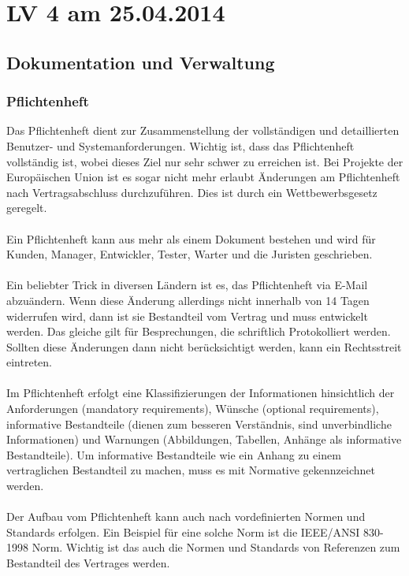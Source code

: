 \chapter{LV 4 am 25.04.2014}
\section{Dokumentation und Verwaltung}
\subsection{Pflichtenheft}
Das Pflichtenheft dient zur Zusammenstellung der vollständigen und detaillierten Benutzer- und Systemanforderungen. Wichtig ist, dass das Pflichtenheft vollständig ist, wobei dieses Ziel nur sehr schwer zu erreichen ist. Bei Projekte der Europäischen Union ist es sogar nicht mehr erlaubt Änderungen am Pflichtenheft nach Vertragsabschluss durchzuführen. Dies ist durch ein Wettbewerbsgesetz geregelt. 
\\\\
Ein Pflichtenheft kann aus mehr als einem Dokument bestehen und wird  für  Kunden, Manager, Entwickler, Tester, Warter und die Juristen geschrieben. 
\\\\
Ein beliebter Trick in diversen Ländern ist es, das Pflichtenheft via E-Mail abzuändern. Wenn diese Änderung allerdings nicht innerhalb von 14 Tagen widerrufen wird, dann ist sie Bestandteil vom Vertrag und muss entwickelt werden. Das gleiche gilt für Besprechungen, die schriftlich Protokolliert werden. Sollten diese Änderungen dann nicht berücksichtigt werden, kann ein Rechtsstreit eintreten.
\\\\
Im Pflichtenheft erfolgt eine Klassifizierungen der Informationen hinsichtlich der Anforderungen (mandatory requirements), Wünsche (optional requirements), informative Bestandteile (dienen zum besseren Verständnis, sind unverbindliche Informationen) und Warnungen (Abbildungen, Tabellen, Anhänge als informative Bestandteile). Um informative Bestandteile wie ein Anhang zu einem vertraglichen Bestandteil zu machen, muss es mit Normative gekennzeichnet werden.
\\\\
Der Aufbau vom Pflichtenheft kann auch nach vordefinierten Normen und Standards erfolgen. Ein Beispiel für eine solche Norm ist die IEEE/ANSI 830-1998 Norm. Wichtig ist das auch die Normen und Standards von Referenzen zum Bestandteil des Vertrages werden.

